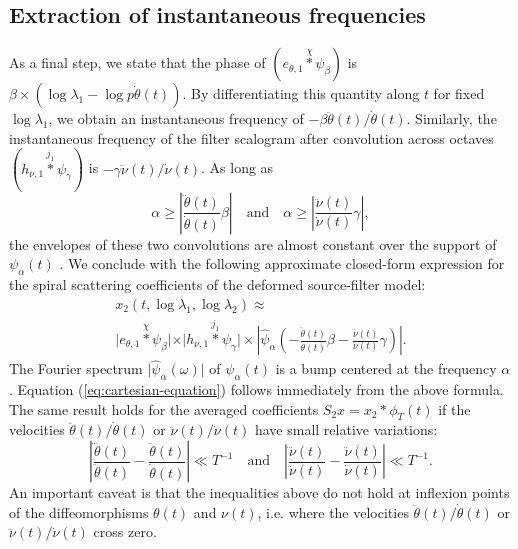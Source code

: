 \documentclass[twoside,a4paper]{article}
\begin{document}
\subsection{Extraction of instantaneous frequencies}
As a final step, we state that the phase of $( e_{\theta,1} \overset{\chi}{\ast} \psi_{\beta} )$ is $\beta\times(\log \lambda_1 - \log p \dot{\theta}(t))$. By differentiating this quantity along $t$ for fixed $\log \lambda_1$, we obtain an instantaneous frequency of $- \beta \ddot{\theta}(t)/\dot{\theta}(t)$. Similarly, the instantaneous frequency of the filter scalogram after convolution across octaves $( h_{\nu,1} \overset{j_{1}}{\ast} \psi_{\gamma} )$ is $ - \gamma \ddot{\nu}(t)/\dot{\nu}(t)$. As long as
\begin{equation}
\alpha \geq \left \vert \frac{\ddot{\theta}(t)}{\dot{\theta}(t)} \beta \right \vert
\quad
\text{and}
\quad
\alpha \geq \left \vert \frac{\ddot{\nu}(t)}{\dot{\nu}(t)} \gamma \right \vert,
\end{equation}
the envelopes of these two convolutions are almost constant over the support of $\psi_{\alpha}(t)$ \cite{Delprat1992}. We conclude with the following approximate closed-form expression for the spiral scattering coefficients of the deformed source-filter model:
\begin{multline}
x_2(t,\log \lambda_1, \log \lambda_2) \approx \\
\vert e_{\theta,1} \overset{\chi}{\ast} \psi_\beta \vert \times
\vert h_{\nu,1} \overset{j_{1}}{\ast} \psi_\gamma \vert \times
\left \vert \widehat{\psi}_{\alpha} \left( -\frac{\ddot{\theta}(t)}{\dot{\theta}(t)} \beta - \frac{\ddot{\nu}(t)}{\dot{\nu}(t)} \gamma \right) \right \vert.
\label{eq:x2-sourcefilter}
\end{multline}
The Fourier spectrum $\vert \widehat{\psi}_\alpha(\omega) \vert$ of $\psi_\alpha(t)$ is a bump centered at the frequency $\alpha$. Equation (\ref{eq:cartesian-equation}) follows immediately from the above formula. The same result holds for the averaged coefficients $S_2 x = x_2 \ast \phi_T (t)$ if the velocities $\ddot{\theta}(t)/\dot{\theta}(t)$ or $\ddot{\nu}(t)/\dot{\nu}(t)$ have small relative variations:
\begin{equation}
\left \vert \frac{\dddot{\theta}(t)}{\ddot{\theta}(t)} - \frac{\ddot{\theta}(t)}{\dot{\theta}(t)} \right \vert \ll T^{-1}
\quad \text{and} \quad
\left \vert \frac{\dddot{\nu}(t)}{\ddot{\nu}(t)} - \frac{\ddot{\nu}(t)}{\dot{\nu}(t)} \right \vert \ll T^{-1}.
\end{equation}
An important caveat is that the inequalities above do not hold at inflexion points of the diffeomorphisms $\theta(t)$ and $\nu(t)$, i.e. where the velocities $\ddot{\theta}(t)/\dot{\theta}(t)$ or $\ddot{\nu}(t)/\dot{\nu}(t)$ cross zero.
\end{document}
